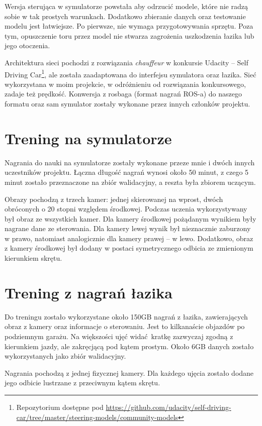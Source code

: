 Wersja sterująca w symulatorze powstała aby odrzucić modele, które nie radzą
sobie w tak prostych warunkach. Dodatkowo zbieranie danych oraz testowanie
modelu jest łatwiejsze. Po pierwsze, nie wymaga przygotowywania sprzętu. Poza tym,
opuszczenie toru przez model nie stwarza zagrożenia uszkodzenia łazika lub jego otoczenia.

Architektura sieci pochodzi z rozwiązania \textit{chauffeur} w konkursie Udacity -- Self Driving Car\footnote
{ Repozytorium dostępne pod \href{https://github.com/udacity/self-driving-car/tree/master/steering-models/community-models}
{https://github.com/udacity/self-driving-car/tree/master/steering-models/community-models}},
ale została zaadaptowana do interfejsu symulatora oraz łazika. Sieć wykorzystana w moim projekcie, w odróżnieniu od rozwiązania konkursowego, zadaje też prędkość. Konwersja z rosbaga (format nagrań ROS-a) do 
naszego formatu oraz sam symulator zostały wykonane przez innych członków projektu.


\section{Trening na symulatorze}
Nagrania do nauki na symulatorze zostały wykonane przeze mnie i dwóch innych
uczestników projektu. Łączna długość nagrań wynosi około 50 minut, z czego 5
minut zostało przeznaczone na zbiór walidacyjny, a reszta była zbiorem uczącym.

Obrazy pochodzą z trzech kamer: jednej skierowanej na wprost, dwóch obróconych
o 20 stopni względem środkowej. Podczas uczenia wykorzystywany był obraz ze wszystkich
kamer. Dla kamery środkowej pożądanym wynikiem były nagrane dane ze sterowania.
Dla kamery lewej wynik był nieznacznie zaburzony w prawo, natomiast analogicznie
dla kamery prawej -- w lewo.
Dodatkowo, obraz z kamery środkowej był dodany w postaci symetrycznego odbicia
ze zmienionym kierunkiem skrętu.

\section{Trening z nagrań łazika}
Do treningu zostało wykorzystane około 150GB nagrań z łazika, zawierających
obraz z kamery oraz informacje o sterowaniu. Jest to kilkanaście objazdów
po podziemnym garażu. Na większości ujęć widać kratkę zazwyczaj zgodną z kierunkiem
jazdy, ale zakręcjącą pod kątem prostym. Około 6GB danych zostało wykorzystanych jako
zbiór walidacyjny.

Nagrania pochodzą z jednej fizycznej kamery. Dla każdego ujęcia zostało
dodane jego odbicie lustrzane z przeciwnym kątem skrętu.

